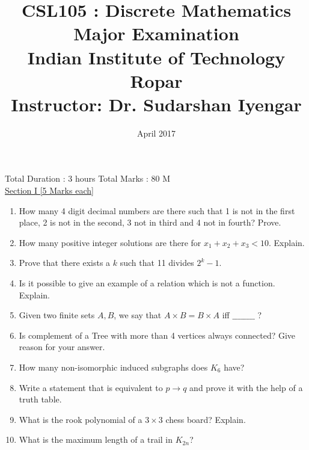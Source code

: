 \documentclass{article}
\title{CSL105 : Discrete Mathematics\\
\large{Major Examination}\\
\large{Indian Institute of Technology Ropar}\\
\small{Instructor: Dr. Sudarshan Iyengar}
}
\date{April 2017}
\begin{document}
\maketitle
Total Duration : 3 hours \hfill Total Marks : 80 M\\

\underline{\large{Section I \hspace*{10cm} [5 Marks each]}}
\begin{enumerate} 
	\item How many 4 digit decimal numbers are there such that 1 is not in the first place, 2 is not in the second, 3 not in third and 4 not in fourth? Prove.    
    
    \item How many positive integer solutions are there for $x_1+x_2+x_3<10$. Explain.
    
   \item Prove that there exists a $k$ such that 11 divides $2^k -1 $.  
    
    \item Is it possible to give an example of a relation which is not a function. Explain.
    
   \item Given two finite sets $A,B$, we say that $A \times B = B \times A$ iff $\_\_\_\_\_\_\_\_$ ? 
   

\item Is complement of a Tree with more than 4 vertices always connected? Give reason for your answer.

\item How many non-isomorphic induced subgraphs does $K_6$ have?

\item Write a statement that is equivalent to $p\rightarrow q$ and prove it with the help of a truth table.

\item What is the rook polynomial of a $3 \times 3$ chess board? Explain.

\item What is the maximum length of a trail in $K_{2n}$?

    
   
   
   
\end{enumerate}
\vspace*{3cm}
\end{document}
